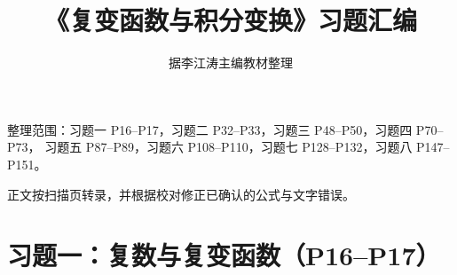 \documentclass[UTF8,11pt,a4paper]{ctexart}
\title{\bfseries\Large 《复变函数与积分变换》习题汇编}
\author{据李江涛主编教材整理}
\date{}
\begin{document}
\maketitle

\begin{center}
\small
整理范围：习题一 P16--P17，习题二 P32--P33，习题三 P48--P50，习题四 P70--P73，
习题五 P87--P89，习题六 P108--P110，习题七 P128--P132，习题八 P147--P151。

正文按扫描页转录，并根据校对修正已确认的公式与文字错误。
\end{center}

\tableofcontents
\newpage

\section{习题一：复数与复变函数（P16--P17）}
\end{document}
